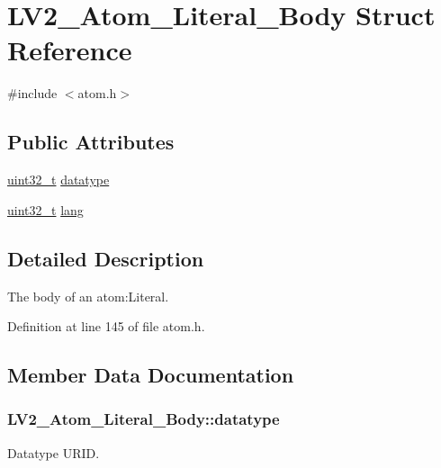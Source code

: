 \hypertarget{struct_l_v2___atom___literal___body}{}\section{L\+V2\+\_\+\+Atom\+\_\+\+Literal\+\_\+\+Body Struct Reference}
\label{struct_l_v2___atom___literal___body}


{\ttfamily \#include $<$atom.\+h$>$}

\subsection*{Public Attributes}
\begin{DoxyCompactItemize}
\item 
\hyperlink{lib-src_2ffmpeg_2win32_2stdint_8h_a6eb1e68cc391dd753bc8ce896dbb8315}{uint32\+\_\+t} \hyperlink{struct_l_v2___atom___literal___body_a3c5d9f2cce92ff6b55f66d34ff931bf9}{datatype}
\item 
\hyperlink{lib-src_2ffmpeg_2win32_2stdint_8h_a6eb1e68cc391dd753bc8ce896dbb8315}{uint32\+\_\+t} \hyperlink{struct_l_v2___atom___literal___body_a4b87355649129047e4a736ea99c56a88}{lang}
\end{DoxyCompactItemize}


\subsection{Detailed Description}
The body of an atom\+:Literal. 

Definition at line 145 of file atom.\+h.



\subsection{Member Data Documentation}
\subsubsection[{\texorpdfstring{datatype}{datatype}}]{ L\+V2\+\_\+\+Atom\+\_\+\+Literal\+\_\+\+Body\+::datatype}\hypertarget{struct_l_v2___atom___literal___body_a3c5d9f2cce92ff6b55f66d34ff931bf9}{}\label{struct_l_v2___atom___literal___body_a3c5d9f2cce92ff6b55f66d34ff931bf9}
Datatype U\+R\+ID. 

